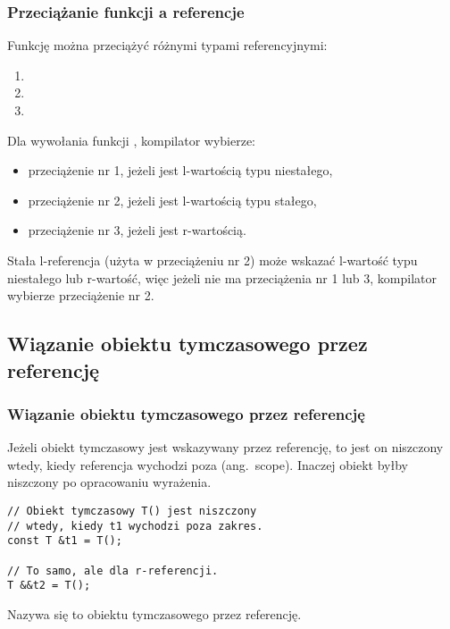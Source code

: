 \documentclass[compress]{beamer}
\begin{document}
\begin{frame}[fragile]

  \frametitle{Przeciążanie funkcji a referencje}

  Funkcję można przeciążyć różnymi typami referencyjnymi:

  \begin{enumerate}
  \item {}
  \item {}
  \item {}
  \end{enumerate}

  Dla wywołania funkcji , kompilator wybierze:

  \begin{itemize}
    \item przeciążenie nr 1, jeżeli  jest l-wartością typu
      niestałego,
    \item przeciążenie nr 2, jeżeli  jest l-wartością typu
      stałego,
    \item przeciążenie nr 3, jeżeli  jest r-wartością.
  \end{itemize}

  Stała l-referencja (użyta w przeciążeniu nr 2) może wskazać
  l-wartość typu niestałego lub r-wartość, więc jeżeli nie ma
  przeciążenia nr 1 lub 3, kompilator wybierze przeciążenie nr 2.

\end{frame}


\subsection{Wiązanie obiektu tymczasowego przez referencję}

\begin{frame}[fragile]

  \frametitle{Wiązanie obiektu tymczasowego przez referencję}

  Jeżeli obiekt tymczasowy jest wskazywany przez referencję, to jest
  on niszczony wtedy, kiedy referencja wychodzi poza 
  (ang.~scope).  Inaczej obiekt byłby niszczony po opracowaniu
  wyrażenia.

  \vspace{0.25 cm}

\begin{lstlisting}
// Obiekt tymczasowy T() jest niszczony
// wtedy, kiedy t1 wychodzi poza zakres.
const T &t1 = T();

// To samo, ale dla r-referencji.
T &&t2 = T();
\end{lstlisting}

  \vspace{0.25 cm}

  Nazywa się to  obiektu tymczasowego przez referencję.

\end{frame}
\end{document}
